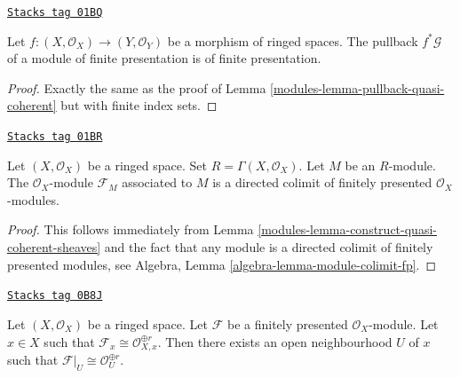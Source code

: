 \begin{lemma}
\label{modules-lemma-pullback-finite-presentation}
\href{https://stacks.math.columbia.edu/tag/01BQ}{\texttt{Stacks tag 01BQ}}

Let $f : (X, \mathcal{O}_X) \to (Y, \mathcal{O}_Y)$
be a morphism of ringed spaces.
The pullback $f^*\mathcal{G}$ of a module of finite presentation
is of finite presentation.
\end{lemma}

\begin{proof}

Exactly the same as the proof of Lemma \ref{modules-lemma-pullback-quasi-coherent}
but with finite index sets.
\end{proof}

\begin{lemma}
\label{modules-lemma-quasi-coherent-limit-finite-presentation}
\href{https://stacks.math.columbia.edu/tag/01BR}{\texttt{Stacks tag 01BR}}

Let $(X, \mathcal{O}_X)$ be a ringed space.
Set $R = \Gamma(X, \mathcal{O}_X)$.
Let $M$ be an $R$-module.
The $\mathcal{O}_X$-module $\mathcal{F}_M$ associated to $M$
is a directed colimit of finitely presented $\mathcal{O}_X$-modules.
\end{lemma}

\begin{proof}

This follows immediately from
Lemma \ref{modules-lemma-construct-quasi-coherent-sheaves}
and the fact that any module is a directed colimit
of finitely presented modules, see
Algebra, Lemma \ref{algebra-lemma-module-colimit-fp}.
\end{proof}

\begin{lemma}
\label{modules-lemma-finite-presentation-stalk-free}
\href{https://stacks.math.columbia.edu/tag/0B8J}{\texttt{Stacks tag 0B8J}}

Let $(X, \mathcal{O}_X)$ be a ringed space. Let $\mathcal{F}$ be
a finitely presented $\mathcal{O}_X$-module. Let $x \in X$ such that
$\mathcal{F}_x \cong \mathcal{O}_{X, x}^{\oplus r}$. Then there exists
an open neighbourhood $U$ of $x$ such that
$\mathcal{F}|_U \cong \mathcal{O}_U^{\oplus r}$.
\end{lemma}

